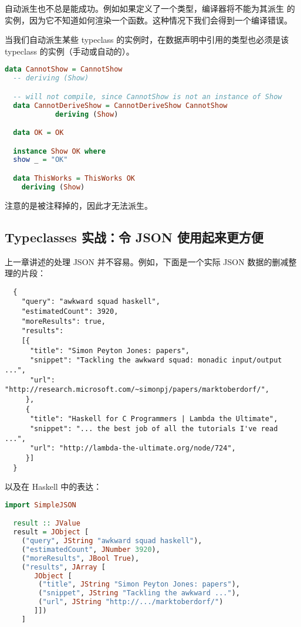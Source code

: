 \documentclass[./main.tex]{subfiles}
\begin{document}
自动派生也不总是能成功。例如如果定义了一个类型，编译器将不能为其派生
的实例，因为它不知道如何渲染一个函数。这种情况下我们会得到一个编译错误。

当我们自动派生某些 typeclass 的实例时，在数据声明中引用的类型也必须是该 typeclass 的实例（手动或自动的）。

\begin{lstlisting}[language=Haskell]
  data CannotShow = CannotShow
  -- deriving (Show)

  -- will not compile, since CannotShow is not an instance of Show
  data CannotDeriveShow = CannotDeriveShow CannotShow
            deriving (Show)

  data OK = OK

  instance Show OK where
  show _ = "OK"

  data ThisWorks = ThisWorks OK
    deriving (Show)
\end{lstlisting}

注意的是被注释掉的，因此才无法派生。

\subsection*{Typeclasses 实战：令 JSON 使用起来更方便}

上一章讲述的处理 JSON 并不容易。例如，下面是一个实际 JSON 数据的删减整理的片段：

\begin{lstlisting}
  {
    "query": "awkward squad haskell",
    "estimatedCount": 3920,
    "moreResults": true,
    "results":
    [{
      "title": "Simon Peyton Jones: papers",
      "snippet": "Tackling the awkward squad: monadic input/output ...",
      "url": "http://research.microsoft.com/~simonpj/papers/marktoberdorf/",
     },
     {
      "title": "Haskell for C Programmers | Lambda the Ultimate",
      "snippet": "... the best job of all the tutorials I've read ...",
      "url": "http://lambda-the-ultimate.org/node/724",
     }]
  }
\end{lstlisting}

以及在 Haskell 中的表达：

\begin{lstlisting}[language=Haskell]
  import SimpleJSON

  result :: JValue
  result = JObject [
    ("query", JString "awkward squad haskell"),
    ("estimatedCount", JNumber 3920),
    ("moreResults", JBool True),
    ("results", JArray [
       JObject [
        ("title", JString "Simon Peyton Jones: papers"),
        ("snippet", JString "Tackling the awkward ..."),
        ("url", JString "http://.../marktoberdorf/")
       ]])
    ]
\end{lstlisting}
\end{document}
